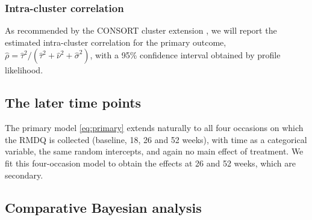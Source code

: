 \documentclass[11pt,a4paper]{article}
\begin{document}
\subsubsection{Intra-cluster correlation}

As recommended by the CONSORT cluster extension \citep{campbell2012}, we
will report the estimated intra-cluster correlation for the
primary outcome, $\hat\rho = \hat\tau^2 / (\hat\tau^2 + \hat\nu^2 +
\hat\sigma^2)$, with a 95\% confidence interval obtained by profile
likelihood.

\subsection{The later time points}

The primary model \eqref{eq:primary} extends naturally to all four occasions
on which the RMDQ is collected (baseline, 18, 26 and 52 weeks), with time as
a categorical variable, the same random intercepts, and again no main effect
of treatment. We fit this four-occasion model to obtain the effects at 26 and
52 weeks, which are secondary.

\subsection{Comparative Bayesian analysis}
\label{sec:bayes}
\end{document}
